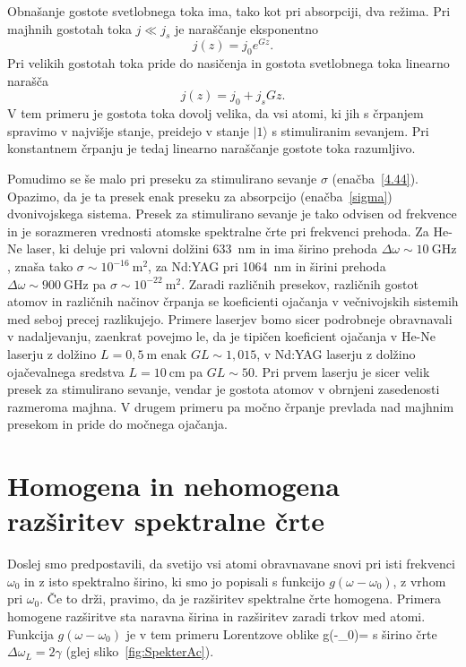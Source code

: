 Obnašanje gostote svetlobnega toka ima, tako kot pri absorpciji, dva režima. 
Pri majhnih gostotah toka $j\ll j_{s}$ je naraščanje eksponentno 
\begin{equation}
j(z)=j_{0}e^{Gz}.
\label{4.45}
\end{equation}
Pri velikih gostotah toka pride do nasičenja in gostota svetlobnega
toka linearno narašča
\begin{equation}
j(z)=j_{0}+j_{s}Gz.
\label{4.46}
\end{equation}
 V tem primeru je gostota toka dovolj velika, da vsi atomi, ki jih
s črpanjem spravimo v najvišje stanje, preidejo v stanje $|1\rangle$
s stimuliranim sevanjem. Pri konstantnem črpanju je tedaj 
linearno naraščanje gostote toka razumljivo. 

Pomudimo se še malo pri preseku za stimulirano sevanje $\sigma$
 (enačba~\ref{4.44}). Opazimo, da je ta presek enak preseku za
absorpcijo (enačba~\ref{sigma}) dvonivojskega sistema. Presek za stimulirano
sevanje je tako odvisen od frekvence in je sorazmeren vrednosti atomske spektralne 
črte pri frekvenci prehoda. Za He-Ne laser, 
ki deluje pri valovni dolžini 633~nm in ima 
širino prehoda $\Delta \omega \sim 10~\si{\giga\hertz}$, znaša tako  $\sigma \sim 10^{-16}~\si{\metre}^2$, 
za Nd:YAG pri 1064~nm in širini prehoda 
$\Delta \omega \sim 900~\si{\giga\hertz}$ pa  $\sigma \sim 10^{-22}~\si{\metre}^2$.
Zaradi različnih presekov, različnih gostot atomov in različnih načinov črpanja se 
koeficienti ojačanja v večnivojskih sistemih med seboj precej razlikujejo. Primere 
laserjev bomo sicer podrobneje obravnavali v nadaljevanju, zaenkrat povejmo 
le, da je tipičen koeficient ojačanja v He-Ne laserju z dolžino $L = 0,5~\si{\metre}$
enak $GL \sim 1,015$, v Nd:YAG laserju z dolžino ojačevalnega sredstva 
$L = 10~\si{\centi\metre}$ pa $GL \sim 50$. Pri prvem laserju je sicer velik presek za stimulirano sevanje, vendar 
je gostota atomov v obrnjeni zasedenosti razmeroma majhna. V drugem primeru pa močno 
črpanje prevlada nad majhnim presekom in pride do močnega ojačanja.

\section{Homogena in nehomogena razširitev spektralne črte}
\label{Razsiritev}
Doslej smo predpostavili, da svetijo vsi atomi obravnavane snovi
pri isti frekvenci $\omega_{0}$ in z isto spektralno širino, ki smo
jo popisali s funkcijo $g(\omega-\omega_0)$, z vrhom pri $\omega_0$. Če to drži, 
pravimo, da je razširitev spektralne črte homogena. 
Primera homogene razširitve sta naravna širina in razširitev zaradi trkov med atomi. 
Funkcija $g(\omega-\omega_0)$ je v tem primeru Lorentzove oblike 
\beq
g(\omega-\omega_0)=
\eeq
s širino črte $\Delta \omega_L = 2\gamma$ (glej sliko~\ref{fig:SpekterAc}). 


